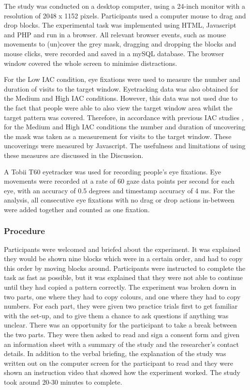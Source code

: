 The study was conducted on a desktop computer, using a 24-inch monitor with a resolution of 2048 x 1152 pixels. Participants used a computer mouse to drag and drop blocks. The experimental task was implemented using HTML, Javascript and PHP and run in a browser.  All relevant browser events, such as mouse movements to (un)cover the grey mask, dragging and dropping the blocks and mouse clicks, were recorded and saved in a mySQL database. The browser window covered the whole screen to minimise distractions.

For the Low IAC condition, eye fixations were used to measure the number and duration of visits to the target window. Eyetracking data was also obtained for the Medium and High IAC conditions. However, this data was not used due to the fact that people were able to also view the target window area whilst the target pattern was covered. Therefore, in accordance with previous IAC studies \citep[e.g.][]{Gray2004}, for the Medium and High IAC conditions the number and duration of uncovering the mask was taken as a measurement for visits to the target window.  These uncoverings were measured by Javascript. The usefulness and limitations of using these measures are discussed in the Discussion.

A Tobii T60 eyetracker was used for recording people's eye fixations. Eye movements were recorded at a rate of 60 gaze data points per second for each eye, with an accuracy of 0.5 degrees and timestamp accuracy of 4 ms. For the analysis, all consecutive eye fixations with no drag or drop actions in-between were added together and counted as one fixation.

\subsubsection{Procedure}
Participants were welcomed and briefed about the experiment. It was explained they would be shown nine blocks which were in a certain order, and had to copy this order by moving blocks around. Participants were instructed to complete the task as fast as possible, but it was explained that they were not able to continue until they had copied a pattern correctly. 
The experiment was broken down in two parts, one where they had to copy colours, and one where they had to copy numbers. For each part, they were given two practice trials first to get familiar with the set-up, and to give them a chance to ask questions if anything was unclear. There was an opportunity for the participant to take a break between the two parts. 
They were then asked to read and sign a consent form and given an information sheet with a summary of the study and the researcher's contact details. In addition to the verbal briefing, the explanation of the study was written out on the computer screen for the participant to read and they were shown an instruction video that showed how the experiment worked. The study took around 20-30 minutes to complete.

